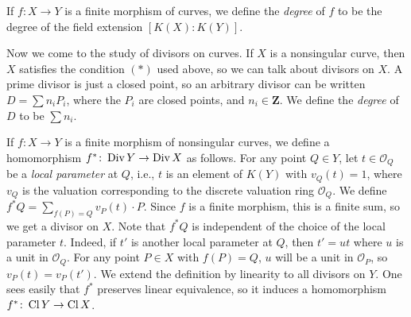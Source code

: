 \begin{definition}
If $f\colon X \to Y$ is a finite morphism of curves, we define the
\emph{degree} of $f$ to be the degree of the field extension
$[K(X)\colon K(Y)]$.
\end{definition}

Now we come to the study of divisors on curves. If $X$ is a nonsingular
curve, then $X$ satisfies the condition $(*)$ used above, so we can talk
about divisors on $X$. A prime divisor is just a closed point, so an
arbitrary divisor can be written $D = \sum n_i P_i$, where the $P_i$ are
closed points, and $n_i \in \mathbf{Z}$. We define the \emph{degree} of $D$
to be $\sum n_i$.

\begin{definition}
If $f\colon X \to Y$ is a finite morphism of nonsingular curves, we define a
homomorphism $f^*\colon \operatorname{Div} Y \to \operatorname{Div} X$ as follows. For any point
$Q \in Y$, let $t \in \mathcal{O}_Q$ be a \emph{local parameter} at $Q$,
i.e., $t$ is an element of $K(Y)$ with $v_Q(t) = 1$, where $v_Q$ is the
valuation corresponding to the discrete valuation ring $\mathcal{O}_Q$. We
define $f^*Q = \sum_{f(P) = Q} v_P(t) \cdot P$. Since $f$ is a finite
morphism, this is a finite sum, so we get a divisor on $X$. Note that $f^*Q$
is independent of the choice of the local parameter $t$. Indeed, if $t'$ is
another local parameter at $Q$, then $t' = ut$ where $u$ is a unit in
$\mathcal{O}_Q$. For any point $P \in X$ with $f(P) = Q$, $u$ will be a unit
in $\mathcal{O}_P$, so $v_P(t) = v_P(t')$. We extend the definition by
linearity to all divisors on $Y$. One sees easily that $f^*$ preserves
linear equivalence, so it induces a homomorphism
$f^*\colon \operatorname{Cl} Y \to \operatorname{Cl} X$.
\end{definition}
